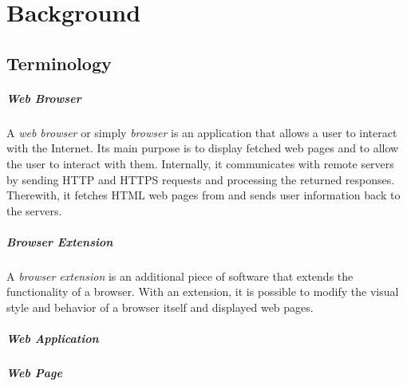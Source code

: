 
\chapter{Background}

\section{Terminology}

\paragraph{Web Browser}

	A \textit{web browser} or simply \textit{browser} is an application that allows a user to interact with the Internet. Its main purpose is to display fetched web pages and to allow the user to interact with them. Internally, it communicates with remote servers by sending HTTP and HTTPS requests and processing the returned responses. Therewith, it fetches HTML web pages from and sends user information back to the servers.
	

\paragraph{Browser Extension}

	A \textit{browser extension} is an additional piece of software that extends the functionality of a browser. With an extension, it is possible to modify the visual style and behavior of a browser itself and displayed web pages. 

\paragraph{Web Application}


\paragraph{Web Page}

